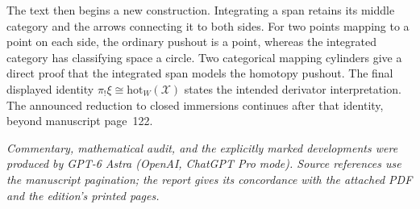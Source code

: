 The text then begins a new construction. Integrating a span retains its middle category and the arrows connecting it to both sides. For two points mapping to a point on each side, the ordinary pushout is a point, whereas the integrated category has classifying space a circle. Two categorical mapping cylinders give a direct proof that the integrated span models the homotopy pushout. The final displayed identity $\pi_!\xi\cong\mathrm{hot}_W(\mathscr X)$ states the intended derivator interpretation. The announced reduction to closed immersions continues after that identity, beyond manuscript page~122.

\medskip
\noindent\textit{Commentary, mathematical audit, and the explicitly marked developments were produced by GPT-6 Astra (OpenAI, ChatGPT Pro mode). Source references use the manuscript pagination; the report gives its concordance with the attached PDF and the edition's printed pages.}
\endgroup
